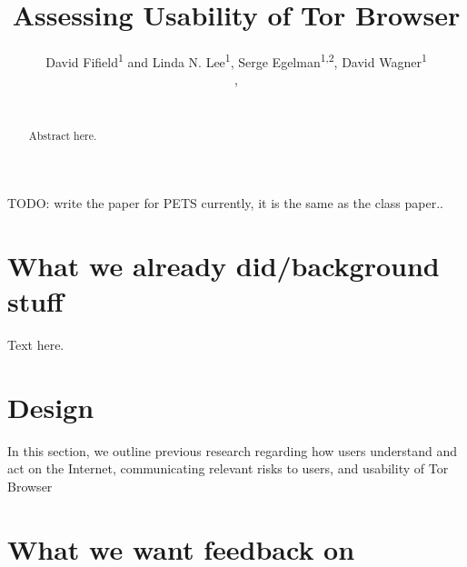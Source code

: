 \documentclass{sig-alternate-hotpets15}
\begin{document}
\title{Assessing Usability of Tor Browser}
\author{
 \alignauthor David Fifield\textsuperscript{1} and Linda N. Lee\textsuperscript{1}, Serge Egelman\textsuperscript{1,2}, David Wagner\textsuperscript{1}\\
   \vspace{0.5em}
   , \\
   \\
}

\maketitle
{\color {red} TODO: write the paper for PETS currently, it is the same as the class paper..}

\begin{abstract}
Abstract here.
\end{abstract}




\section{What we already did/background stuff}

Text here.

\section{Design}
In this section, we outline previous research regarding how users understand and act on the Internet, communicating relevant risks to users, and usability of Tor Browser

\section{What we want feedback on}





 
\end{document}
